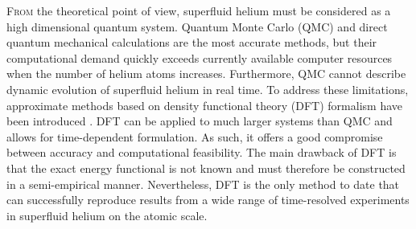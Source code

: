 \documentclass[12pt,a4paper]{book}
\begin{document}
		\lettrine[lines=3,findent=3pt,nindent=0pt]{F}{rom} the theoretical point of view, superfluid helium must be considered as a high dimensional quantum system. Quantum Monte Carlo (QMC) \cite{Kro02} and direct quantum mechanical \cite{deL06,deL10,Agu13} calculations are the most accurate methods, but their computational demand quickly exceeds currently available computer resources when the number of helium atoms increases. Furthermore, QMC cannot describe dynamic evolution of superfluid helium in real time. To address these limitations, approximate methods based on  density functional theory (DFT) formalism have been introduced \cite{Str87a,Str87b,Dal95}. DFT can be applied to much larger systems than QMC and allows for time-dependent formulation. As such, it offers a good compromise between accuracy and computational feasibility. The main drawback of DFT is that the exact energy functional is not known and must therefore be constructed in a semi-empirical manner. Nevertheless, DFT is the only method to date that can successfully reproduce results from a wide range of time-resolved experiments in superfluid helium on the atomic scale.\\
		
\end{document}
